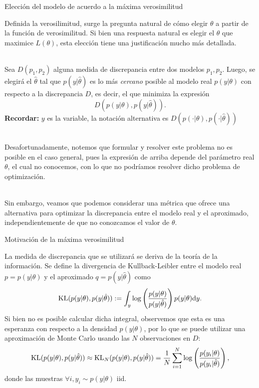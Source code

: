 \documentclass[handout, 9pt]{beamer}
\begin{document}
\begin{frame}{Elección del modelo de acuerdo a la máxima verosimilitud}

Definida la verosilimitud, surge la pregunta natural de cómo elegir $\theta$ a partir de la función de verosimilitud. Si bien una respuesta natural es elegir el $\theta$ que maximice $L(\theta)$, esta elección tiene una justificación mucho más detallada.\\~\ \pause

Sea $D(p_1,p_2)$ alguna medida de discrepancia entre dos modelos $p_1,p_2$. Luego, se elegirá el $\hat\theta$ tal que $p(y|\hat\theta)$ es lo más \emph{cercano} posible al modelo real $p(y|\theta)$ con respecto a la discrepancia $D$, es decir, el que minimiza la expresión
\begin{equation*}
    	D(p(y|\theta),p(y|\hat\theta)).
\end{equation*} \pause
\textbf{Recordar:} $y$ es la variable, la notación alternativa es $D(p(\cdot|\theta),p(\cdot|\hat\theta))$\\~\

Desafortunadamente, notemos que formular y resolver  este problema no es posible en el caso general, pues la expresión de arriba depende del parámetro real $\theta$, el cual no conocemos, con lo que no podríamos resolver dicho problema de optimización.\\~\

Sin embargo, veamos que podemos considerar una métrica que ofrece una alternativa para optimizar la discrepancia entre el modelo real y el aproximado, independientemente de que no conozcamos el valor de $\theta$.

\end{frame}

\begin{frame}{Motivación de la máxima verosimilitud}

La medida de discrepancia que se utilizará se deriva de la teoría de la información. Se define la divergencia de Kullback-Leibler entre el modelo real $p =  p(y|\theta)$ y el aproximado $q  = p(y|\hat\theta)$ como
\begin{equation*}
 	\operatorname{\text{KL}}( p(y|\theta),p(y|\hat\theta)) :=  \int_y\log\left(\frac{p(y|\theta)}{p(y|\hat\theta)}\right)p(y|\theta){\text d} y.\label{eq:KL_maxlike}
 \end{equation*} \pause
Si bien no es posible calcular dicha integral, observemos que esta es una esperanza con respecto a la densidad $p(y|\theta)$, por lo que se puede utilizar una aproximación de Monte Carlo usando las $N$ observaciones en $D$:
\begin{equation*}
	\operatorname{\text{KL}}( p(y|\theta),p(y|\hat\theta)) 	\approx \operatorname{\text{KL}}_N( p(y|\theta),p(y|\hat\theta)) = \frac{1}{N}\sum_{i=1}^N\log\left(\frac{p(y_i|\theta)}{p(y_i|\hat\theta)}\right),
\end{equation*}
donde las muestras $\forall i, y_i\sim p(y|\theta)$ iid.
	
\end{frame}
\end{document}
